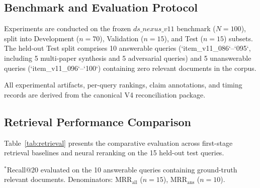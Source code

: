 \documentclass[conference]{IEEEtran}
\begin{document}
\subsection{Benchmark and Evaluation Protocol}
Experiments are conducted on the frozen $ds\_nexus\_v11$ benchmark ($N=100$), split into Development ($n=70$), Validation ($n=15$), and Test ($n=15$) subsets. The held-out Test split comprises 10 answerable queries (`item_v11_086`–`095`, including 5 multi-paper synthesis and 5 adversarial queries) and 5 unanswerable queries (`item_v11_096`–`100`) containing zero relevant documents in the corpus.

All experimental artifacts, per-query rankings, claim annotations, and timing records are derived from the canonical V4 reconciliation package.

\subsection{Retrieval Performance Comparison}
Table~\ref{tab:retrieval} presents the comparative evaluation across first-stage retrieval baselines and neural reranking on the 15 held-out test queries.

\begin{table}[htbp]
\caption{Retrieval Performance on $ds\_nexus\_v11$ Test Split ($N=15$)}
\label{tab:retrieval}
\centering
{}
\vspace{1mm}
\footnotesize{\newline $^*$Recall@20 evaluated on the 10 answerable queries containing ground-truth relevant documents. Denominators: $\text{MRR}_{\text{all}}$ ($n=15$), $\text{MRR}_{\text{ans}}$ ($n=10$).}
\end{table}
\end{document}
